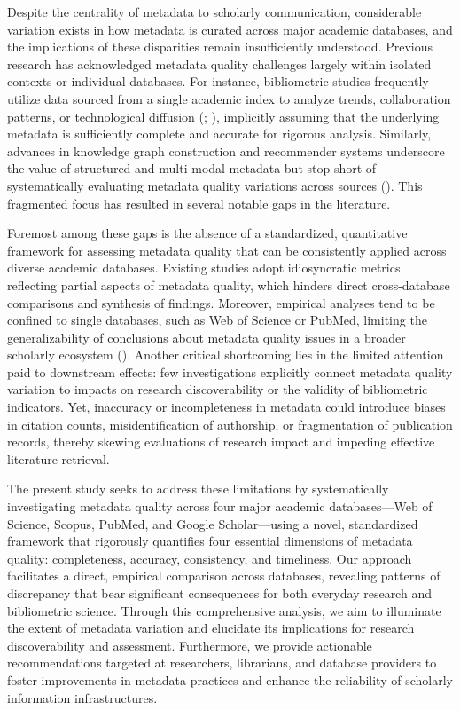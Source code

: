 \documentclass[
  12pt,
]{article}
\begin{document}
Despite the centrality of metadata to scholarly communication,
considerable variation exists in how metadata is curated across major
academic databases, and the implications of these disparities remain
insufficiently understood. Previous research has acknowledged metadata
quality challenges largely within isolated contexts or individual
databases. For instance, bibliometric studies frequently utilize data
sourced from a single academic index to analyze trends, collaboration
patterns, or technological diffusion (; ), implicitly assuming
that the underlying metadata is sufficiently complete and accurate for
rigorous analysis. Similarly, advances in knowledge graph construction
and recommender systems underscore the value of structured and
multi-modal metadata but stop short of systematically evaluating
metadata quality variations across sources (). This fragmented focus has resulted in several notable
gaps in the literature.

Foremost among these gaps is the absence of a standardized, quantitative
framework for assessing metadata quality that can be consistently
applied across diverse academic databases. Existing studies adopt
idiosyncratic metrics reflecting partial aspects of metadata quality,
which hinders direct cross-database comparisons and synthesis of
findings. Moreover, empirical analyses tend to be confined to single
databases, such as Web of Science or PubMed, limiting the
generalizability of conclusions about metadata quality issues in a
broader scholarly ecosystem ().
Another critical shortcoming lies in the limited attention paid to
downstream effects: few investigations explicitly connect metadata
quality variation to impacts on research discoverability or the validity
of bibliometric indicators. Yet, inaccuracy or incompleteness in
metadata could introduce biases in citation counts, misidentification of
authorship, or fragmentation of publication records, thereby skewing
evaluations of research impact and impeding effective literature
retrieval.

The present study seeks to address these limitations by systematically
investigating metadata quality across four major academic
databases---Web of Science, Scopus, PubMed, and Google Scholar---using a
novel, standardized framework that rigorously quantifies four essential
dimensions of metadata quality: completeness, accuracy, consistency, and
timeliness. Our approach facilitates a direct, empirical comparison
across databases, revealing patterns of discrepancy that bear
significant consequences for both everyday research and bibliometric
science. Through this comprehensive analysis, we aim to illuminate the
extent of metadata variation and elucidate its implications for research
discoverability and assessment. Furthermore, we provide actionable
recommendations targeted at researchers, librarians, and database
providers to foster improvements in metadata practices and enhance the
reliability of scholarly information infrastructures.
\end{document}
